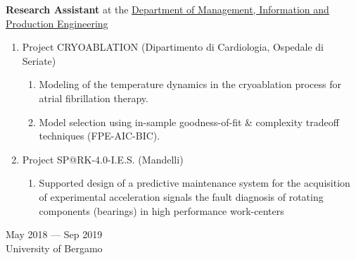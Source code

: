 \documentclass[10pt]{article}
\begin{document}
\par\vspace{6pt}
\noindent
\begin{minipage}[t]{.80\textwidth}
	\raggedright
	\textbf{Research Assistant} at the \href{https://digip.unibg.it/}{Department of Management, Information and Production Engineering}
	\begin{enumerate}
		\item Project CRYOABLATION ({\small Dipartimento di Cardiologia, Ospedale di Seriate})
		\begin{enumerate}
			\item Modeling of the temperature dynamics in the cryoablation process for atrial fibrillation therapy.
			\item Model selection using in-sample goodness-of-fit \& complexity tradeoff techniques (FPE-AIC-BIC).
		\end{enumerate}
		\item Project SP@RK-4.0-I.E.S. ({\small Mandelli})
		\begin{enumerate}
			\item Supported design of a predictive maintenance system for the acquisition of experimental acceleration signals the fault diagnosis of rotating components (bearings) in high performance work-centers
		\end{enumerate}
  \end{enumerate}
\end{minipage}%
\hspace{.02\textwidth}\vrule\hspace{.02\textwidth}
\begin{minipage}[t]{.16\textwidth}
	\raggedleft
	May 2018 --- Sep 2019\\
	\small University of Bergamo\\
\end{minipage}%
\par\vspace{6pt}
\end{document}
